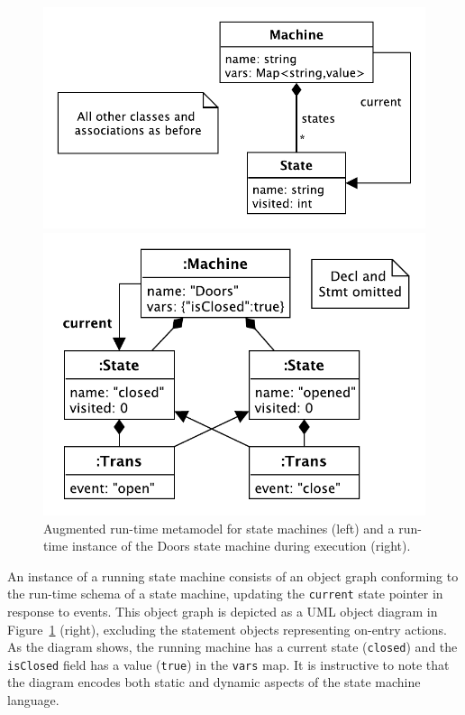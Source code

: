\documentclass[english,submission]{programming}
\begin{document}
\begin{figure}[t]
\vspace{-0.5em}
\centering
\begin{minipage}{0.5\textwidth}
\includegraphics[width=\textwidth]{figures/runtime-model.pdf}
\end{minipage}
\hspace*{2pt}
\vline
\begin{minipage}{0.4\textwidth}
\includegraphics[width=\textwidth]{figures/doorsmachine.pdf}
\end{minipage}
\caption{Augmented run-time metamodel for state machines (left) and a run-time instance
of the Doors state machine during execution (right).}
\label{FIG:doorsRuntime}
\vspace{-0.5em}
\end{figure}

An instance of a running state machine consists of an object graph conforming to the run-time
schema of a state machine, updating the \lstinline{current} state pointer in response to events.
This object graph is depicted as a UML object diagram in Figure~\ref{FIG:doorsRuntime} (right),
excluding the statement objects representing on-entry actions. As the diagram shows, the running
machine has a current state (\lstinline{closed}) and the \lstinline{isClosed} field has a
value (\lstinline{true}) in the \lstinline{vars} map. It is instructive to note that the
diagram encodes both static and dynamic aspects of the state machine language.
\end{document}
